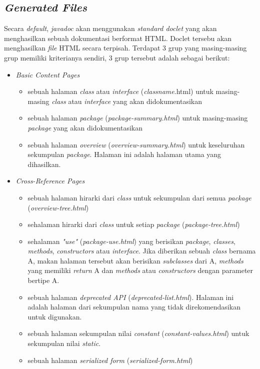\subsection{\textit{Generated Files}}
\label{sec:generated-files}
Secara {\it default}, {\it javadoc} akan menggunakan {\it standard doclet} yang akan menghasilkan sebuah dokumentasi berformat HTML. Doclet tersebu akan menghasilkan {\it file} HTML secara terpisah. Terdapat 3 grup yang masing-masing grup memiliki kriterianya sendiri, 3 grup tersebut adalah sebagai berikut:
\begin{itemize}
	\item {\it Basic Content Pages}
	\begin{itemize}
		\item sebuah halaman {\it class} atau {\it interface} ({\it classname}.html) untuk masing-masing {\it class} atau {\it interface} yang akan didokumentasikan
		\item sebuah halaman {\it package} ({\it package-summary.html}) untuk masing-masing {\it package} yang akan didokumentasikan
		\item sebuah halaman {\it overview} ({\it overview-summary.html}) untuk keseluruhan sekumpulan {\it package}. Halaman ini adalah halaman utama yang dihasilkan.
	\end{itemize}
	\item {\it Cross-Reference Pages}
	\begin{itemize}
		\item sebuah halaman hirarki dari {\it class} untuk sekumpulan dari semua {\it package} ({\it overview-tree.html})
		\item sehalaman hirarki dari {\it class} untuk setiap {\it package} ({\it package-tree.html})
		\item sehalaman {\it "use"} ({\it package-use.html}) yang berisikan {\it package}, {\it classes}, {\it methods}, {\it constructors} atau {\it interface}. Jika diberikan sebuah {\it class} bernama A, makan halaman tersebut akan berisikan {\it subclasses} dari A, {\it methods} yang memiliki {\it return} A dan {\it methods} atau {\it constructors} dengan parameter bertipe A.
		\item sebuah halaman {\it deprecated API} ({\it deprecated-list.html}). Halaman ini adalah halaman dari sekumpulan nama yang tidak direkomendasikan untuk digunakan.
		\item sebuah halaman sekumpulan nilai {\it constant} ({\it constant-values.html}) untuk sekumpulan nilai {\it static}.
		\item sebuah halaman {\it serialized form} ({\it serialized-form.html})

\end{itemize}
\end{itemize}
